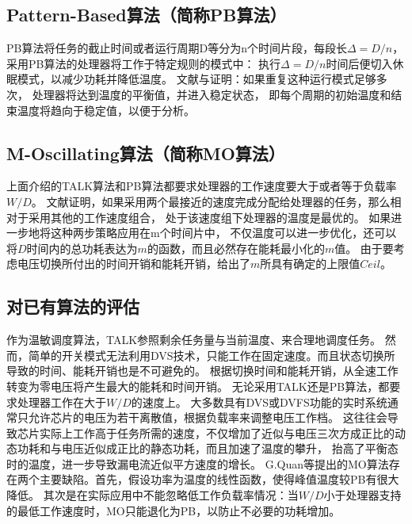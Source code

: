 \subsection{Pattern-Based算法（简称PB算法）}

PB算法将任务的截止时间或者运行周期D等分为n个时间片段，每段长$\Delta=D/n$， 采用PB算法的处理器将工作于特定规则的模式中： 执行$\Delta=D/n$时间后便切入休眠模式，以减少功耗并降低温度。 文献与证明：如果重复这种运行模式足够多次， 处理器将达到温度的平衡值，并进入稳定状态， 即每个周期的初始温度和结束温度将趋向于稳定值，以便于分析。

\subsection{M-Oscillating算法（简称MO算法）}

上面介绍的TALK算法和PB算法都要求处理器的工作速度要大于或者等于负载率$W/D$。 文献证明，如果采用两个最接近的速度完成分配给处理器的任务，那么相对于采用其他的工作速度组合， 处于该速度组下处理器的温度是最优的。 如果进一步地将这种两步策略应用在m个时间片中， 不仅温度可以进一步优化，还可以将$D$时间内的总功耗表达为$m$的函数，而且必然存在能耗最小化的$m$值。 由于要考虑电压切换所付出的时间开销和能耗开销，给出了$m$所具有确定的上限值$Ceil$。

\subsection{对已有算法的评估}
作为温敏调度算法，TALK参照剩余任务量与当前温度、来合理地调度任务。 然而，简单的开关模式无法利用DVS技术，只能工作在固定速度。而且状态切换所导致的时间、能耗开销也是不可避免的。 根据切换时间和能耗开销，从全速工作转变为零电压将产生最大的能耗和时间开销。
无论采用TALK还是PB算法，都要求处理器工作在大于$W/D$的速度上。 大多数具有DVS或DVFS功能的实时系统通常只允许芯片的电压为若干离散值，根据负载率来调整电压工作档。 这往往会导致芯片实际上工作高于任务所需的速度，不仅增加了近似与电压三次方成正比的动态功耗和与电压近似成正比的静态功耗，而且加速了温度的攀升， 抬高了平衡态时的温度，进一步导致漏电流近似平方速度的增长。
G.Quan等提出的MO算法存在两个主要缺陷。首先，假设功率为温度的线性函数，使得峰值温度较PB有很大降低。 其次是在实际应用中不能忽略低工作负载率情况：当$W/D$小于处理器支持的最低工作速度时，MO只能退化为PB，以防止不必要的功耗增加。



